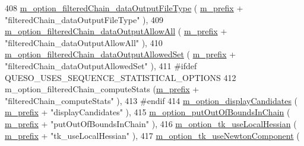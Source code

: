 \begin{DoxyCode}
408   \hyperlink{class_q_u_e_s_o_1_1_metropolis_hastings_s_g_options_aca1e9af38b6ef1b83bf1fda6477404c4}{m\_option\_filteredChain\_dataOutputFileType}          (
      \hyperlink{class_q_u_e_s_o_1_1_metropolis_hastings_s_g_options_a4f7c510aaa530336d24259e2a89f5d0b}{m\_prefix} + \textcolor{stringliteral}{"filteredChain\_dataOutputFileType"}          ),
409   \hyperlink{class_q_u_e_s_o_1_1_metropolis_hastings_s_g_options_a7317db52b0866c8895ad1a16d4a4b337}{m\_option\_filteredChain\_dataOutputAllowAll}          (
      \hyperlink{class_q_u_e_s_o_1_1_metropolis_hastings_s_g_options_a4f7c510aaa530336d24259e2a89f5d0b}{m\_prefix} + \textcolor{stringliteral}{"filteredChain\_dataOutputAllowAll"}          ),
410   \hyperlink{class_q_u_e_s_o_1_1_metropolis_hastings_s_g_options_a361df3110aea27f35465dedac372a90f}{m\_option\_filteredChain\_dataOutputAllowedSet}        (
      \hyperlink{class_q_u_e_s_o_1_1_metropolis_hastings_s_g_options_a4f7c510aaa530336d24259e2a89f5d0b}{m\_prefix} + \textcolor{stringliteral}{"filteredChain\_dataOutputAllowedSet"}        ),
411 \textcolor{preprocessor}{#ifdef QUESO\_USES\_SEQUENCE\_STATISTICAL\_OPTIONS}
412 \textcolor{preprocessor}{}  m\_option\_filteredChain\_computeStats                (\hyperlink{class_q_u_e_s_o_1_1_metropolis_hastings_s_g_options_a4f7c510aaa530336d24259e2a89f5d0b}{m\_prefix} + \textcolor{stringliteral}{"filteredChain\_computeStats"}      
                ),
413 \textcolor{preprocessor}{#endif}
414 \textcolor{preprocessor}{}  \hyperlink{class_q_u_e_s_o_1_1_metropolis_hastings_s_g_options_a7881fafcf3caa7bf33d20ff0a7576944}{m\_option\_displayCandidates}                         (
      \hyperlink{class_q_u_e_s_o_1_1_metropolis_hastings_s_g_options_a4f7c510aaa530336d24259e2a89f5d0b}{m\_prefix} + \textcolor{stringliteral}{"displayCandidates"}                         ),
415   \hyperlink{class_q_u_e_s_o_1_1_metropolis_hastings_s_g_options_a6d1856b0435c6dfcac6b75ec36829b47}{m\_option\_putOutOfBoundsInChain}                     (
      \hyperlink{class_q_u_e_s_o_1_1_metropolis_hastings_s_g_options_a4f7c510aaa530336d24259e2a89f5d0b}{m\_prefix} + \textcolor{stringliteral}{"putOutOfBoundsInChain"}                     ),
416   \hyperlink{class_q_u_e_s_o_1_1_metropolis_hastings_s_g_options_a8b184b15ebded02f00668b1d0f761a2d}{m\_option\_tk\_useLocalHessian}                        (
      \hyperlink{class_q_u_e_s_o_1_1_metropolis_hastings_s_g_options_a4f7c510aaa530336d24259e2a89f5d0b}{m\_prefix} + \textcolor{stringliteral}{"tk\_useLocalHessian"}                        ),
417   \hyperlink{class_q_u_e_s_o_1_1_metropolis_hastings_s_g_options_af732a2bed220e834c03802de602025fa}{m\_option\_tk\_useNewtonComponent}                     (

\end{DoxyCode}
